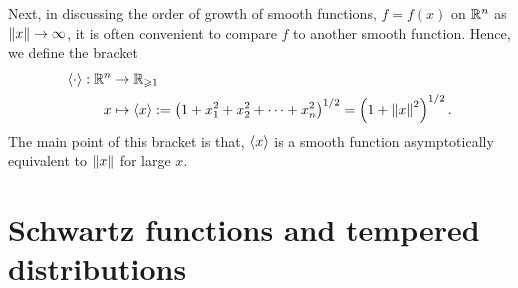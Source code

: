 \documentclass[12pt]{article}
\begin{document}
Next, in discussing the order of growth of smooth functions, $f = f(x)$ on $\R^n$ as $\norm[x] \to \infty$, it is often convenient to compare $f$ to another smooth function. Hence, we define the bracket 
\begin{align*}
\sym[\cdot] : \R^n &\to \R_{\geq 1} \\
x &\mapsto \sym[x] := \brac{ 1 + x_1^2 + x_2^2 + \dots + x_n^2}^{1/2} = \brac{1 + \norm[x]^2}^{1/2}. 
\end{align*}
The main point of this bracket is that,  $\sym[x]$ is a smooth function asymptotically equivalent to $\norm[x]$ for large $x$. 




\section{Schwartz functions and tempered distributions}
\end{document}
